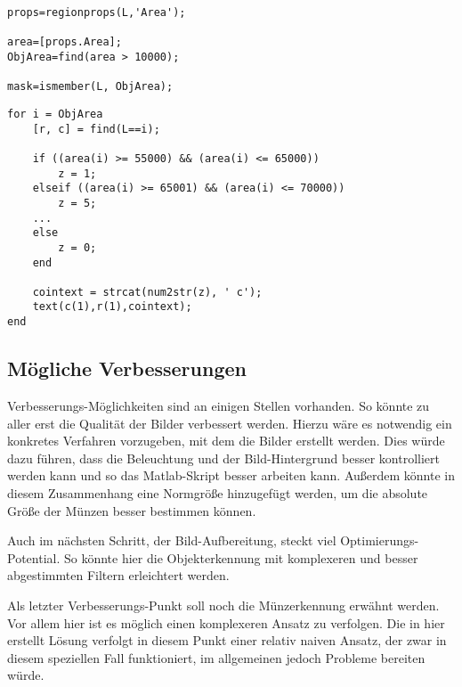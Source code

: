\documentclass[a4paper,DIV=calc,ngerman]{scrartcl}
\begin{document}
\begin{lstlisting}[frame=single, float, caption={Objekt-Segmentierung}, label={lst:segmentierung}]
props=regionprops(L,'Area');

area=[props.Area];
ObjArea=find(area > 10000);

mask=ismember(L, ObjArea);
\end{lstlisting}



\begin{lstlisting}[frame=single, float, caption={Objekt-Segmentierung}, label={lst:segmentierung}]
for i = ObjArea
    [r, c] = find(L==i);
    
    if ((area(i) >= 55000) && (area(i) <= 65000))
        z = 1;
    elseif ((area(i) >= 65001) && (area(i) <= 70000))
        z = 5;
    ...
    else
        z = 0;
    end

    cointext = strcat(num2str(z), ' c');
    text(c(1),r(1),cointext);
end
\end{lstlisting}


\subsection{Mögliche Verbesserungen}
\label{sec:a1verbesserungen}
Verbesserungs-Möglichkeiten sind an einigen Stellen vorhanden. So könnte zu aller erst die Qualität der Bilder verbessert werden. Hierzu wäre es notwendig ein konkretes Verfahren vorzugeben, mit dem die Bilder erstellt werden. Dies würde dazu führen, dass die Beleuchtung und der Bild-Hintergrund besser kontrolliert werden kann und so das Matlab-Skript besser arbeiten kann. Außerdem könnte in diesem Zusammenhang eine Normgröße hinzugefügt werden, um die absolute Größe der Münzen besser bestimmen können.

Auch im nächsten Schritt, der Bild-Aufbereitung, steckt viel Optimierungs-Potential. So könnte hier die Objekterkennung mit komplexeren und besser abgestimmten Filtern erleichtert werden.

Als letzter Verbesserungs-Punkt soll noch die Münzerkennung erwähnt werden. Vor allem hier ist es möglich einen komplexeren Ansatz zu verfolgen. Die in hier erstellt Lösung verfolgt in diesem Punkt einer relativ naiven Ansatz, der zwar in diesem speziellen Fall funktioniert, im allgemeinen jedoch Probleme bereiten würde. 






\lstset{language=python}
\end{document}
